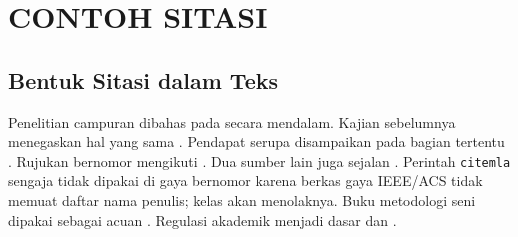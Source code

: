 \documentclass[sitasi=acs,logodir=../../logo,logo=logo-placeholder]{unnes-ta}
\begin{document}
\bagianutama

\chapter{CONTOH SITASI}
\section{Bentuk Sitasi dalam Teks}
Penelitian campuran dibahas pada \cite{creswell2018research} secara mendalam.
Kajian sebelumnya menegaskan hal yang sama \citep{martin2014write}.
Pendapat serupa disampaikan pada bagian tertentu \citep[955]{martin2014write}.
Rujukan bernomor mengikuti \cite{geraldi2017project}.
Dua sumber lain juga sejalan \citep{febriani2020memahami,shils1993etika}.
Perintah \texttt{citemla} sengaja tidak dipakai di gaya bernomor karena berkas gaya IEEE/ACS tidak memuat daftar nama penulis; kelas akan menolaknya.
Buku metodologi seni dipakai sebagai acuan \citep{rohidi2012research}.
Regulasi akademik menjadi dasar \citep{permendikbudristek2023} dan
\citep{unnes2024panduanakademik}.

\end{document}
